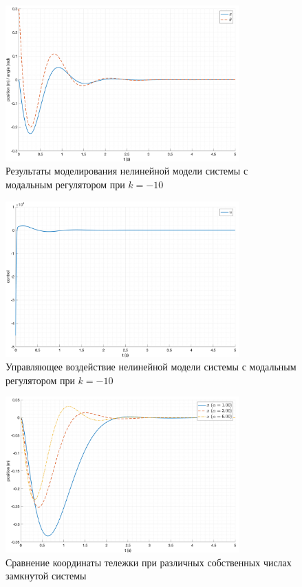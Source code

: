 \begin{figure}[ht!]
    \centering
    \includegraphics[width=0.8\textwidth]{media/plots/modal_controllers/out_4.png}
    \caption{Результаты моделирования нелинейной модели системы с модальным регулятором при $k = -10$}
    \label{fig:modal_controlers_4_out}
\end{figure}
\begin{figure}[ht!]
    \centering
    \includegraphics[width=0.8\textwidth]{media/plots/modal_controllers/u_4.png}
    \caption{Управляющее воздействие нелинейной модели системы с модальным регулятором при $k = -10$}
    \label{fig:modal_controlers_4_u}
\end{figure}
\begin{figure}[ht!]
    \centering
    \includegraphics[width=0.8\textwidth]{media/plots/modal_controllers/x_cmp.png}
    \caption{Сравнение координаты тележки при различных собственных числах замкнутой системы}
    \label{fig:modal_controlers_x_cmp}
\end{figure}
